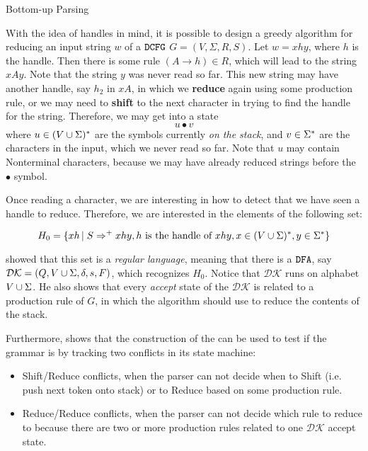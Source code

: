 \begin{section}{Bottom-up Parsing}\label{sec:bottom-up}

With the idea of handles in mind, it is possible to design a greedy algorithm
for reducing an input string $w$ of a $\texttt{DCFG}$ $G = (V, \Sigma, R, S)$. Let $w = xhy$, where $h$ is the
handle. Then there is some rule $\left(A \rightarrow h \right) \in R$, which will lead to the
string $xAy$. Note that the string $y$ was never read so far. This new string
may have another handle, say $h_2$ in $xA$, in which we \textbf{reduce} again
using some production rule, or we may need to \textbf{shift} to the next character
in trying to find the handle for the string. Therefore, we may get into a state
$$u \bullet v$$
where $u \in (V \cup \Sigma)^*$ are the symbols currently \textit{on the stack},
and $v \in \Sigma^*$ are the characters in the input, which we never read so far.
Note that $u$ may contain Nonterminal characters, because we may have already
reduced strings before the $\bullet$ symbol.

Once reading a character, we are interesting in how to detect that we have
seen a handle to reduce. Therefore, we are interested in the elements of
the following set:

$$H_0 = \{xh\,|\;S \Rightarrow^+ xhy, h \text{ is the handle of } xhy, x \in (V \cup \Sigma)^*, y \in \Sigma^*\}$$

\cite{knuth1965translation} showed that this set is a \textit{regular language},
meaning that there is a $\texttt{DFA}$, say $\mathcal{DK} = (Q, V \cup \Sigma, \delta, s, F)$, which
recognizes $H_0$. Notice that $\mathcal{DK}$ runs on alphabet $V \cup \Sigma$.
He also shows that every \textit{accept} state of the $\mathcal{DK}$ is related
to a production rule of $G$, in which the algorithm should use to reduce the
contents of the stack.

Furthermore, \cite{sipser2012} shows that the construction of the
\DFA can be used to test if the grammar is \DCFG by tracking two
conflicts in its state machine:

\begin{itemize}
	\item Shift/Reduce conflicts, when the parser can not decide when
	to Shift (i.e. push next token onto stack) or to Reduce based on
	some production rule.

	\item Reduce/Reduce conflicts, when the parser can not decide which
	rule to reduce to because there are two or more production rules
	related to one $\mathcal{DK}$ accept state.
\end{itemize}


\end{section}
